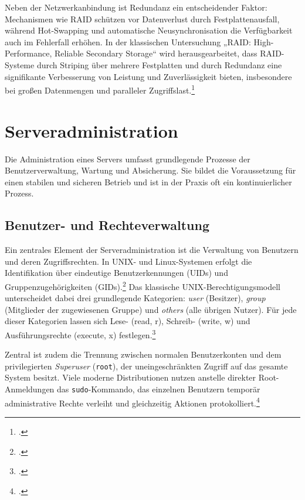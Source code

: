\documentclass[12pt,a4paper]{report}
\begin{document}
  Neben der Netzwerkanbindung ist Redundanz ein entscheidender Faktor: Mechanismen 
  wie \ac{RAID} schützen vor Datenverlust durch 
  Festplattenausfall, während Hot-Swapping und automatische Neusynchronisation 
  die Verfügbarkeit auch im Fehlerfall erhöhen. In der klassischen Untersuchung „\ac{RAID}: 
  High-Performance, Reliable Secondary Storage“ wird herausgearbeitet, dass \ac{RAID}-Systeme durch Striping über mehrere Festplatten 
  und durch Redundanz eine signifikante Verbesserung von Leistung und Zuverlässigkeit bieten, insbesondere bei großen Datenmengen 
  und paralleler Zugriffslast.\footcite[Vgl.][151 ~ff.]{chen2004raid}

\section{Serveradministration}
Die Administration eines Servers umfasst grundlegende Prozesse der Benutzerverwaltung, Wartung und Absicherung. 
Sie bildet die Voraussetzung für einen stabilen und sicheren Betrieb und ist in der Praxis oft ein kontinuierlicher Prozess. %

  \subsection{Benutzer- und Rechteverwaltung}
  Ein zentrales Element der Serveradministration ist die Verwaltung von Benutzern und deren Zugriffsrechten. 
  In UNIX- und Linux-Systemen erfolgt die Identifikation über eindeutige Benutzerkennungen (\acs{UID}s) 
  und Gruppenzugehörigkeiten (\acs{GID}s).\footcite[Vgl.][S.~176~ff.]{nemeth_unixlinux}
  Das klassische UNIX-Berechtigungsmodell unterscheidet dabei drei grundlegende Kategorien: 
  \emph{user} (Besitzer), \emph{group} (Mitglieder der zugewiesenen Gruppe) und \emph{others} (alle übrigen Nutzer). 
  Für jede dieser Kategorien lassen sich Lese- (read, r), Schreib- (write, w) und Ausführungsrechte (execute, x) festlegen.\footcite[Vgl.]{wikipedia_dateisystemrechte}

  Zentral ist zudem die Trennung zwischen normalen Benutzerkonten und dem privilegierten \emph{Superuser} (\texttt{root}), 
  der uneingeschränkten Zugriff auf das gesamte System besitzt. 
  Viele moderne Distributionen nutzen anstelle direkter Root-Anmeldungen das \texttt{sudo}-Kommando, 
  das einzelnen Benutzern temporär administrative Rechte verleiht und gleichzeitig Aktionen protokolliert.\footcite[Vgl.][S.~112~ff.]{nemeth_unixlinux}
\end{document}
